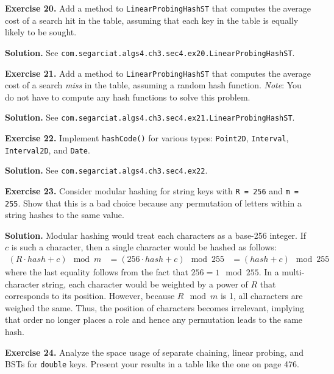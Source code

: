 \documentclass[12pt, a4paper]{article}
\newenvironment{ex}[2][Exercise]
{\par\medskip\noindent \textbf{#1 #2.}}
{\medskip}
\newenvironment{sol}[1][Solution]
{\par\medskip\noindent \textbf{#1.} }
{\medskip}
\begin{document}
	\begin{ex}{20}
		Add a method to \texttt{LinearProbingHashST} that computes the average cost of a search hit
		in the table, assuming that each key in the table is equally likely to be sought.
	\end{ex}
	\begin{sol}
		See \texttt{com.segarciat.algs4.ch3.sec4.ex20.LinearProbingHashST}.
	\end{sol}
	\begin{ex}{21}
		Add a method to \texttt{LinearProbingHashST} that computes the average cost of a search \emph{miss}
		in the table, assuming a random hash function. \emph{Note}: You do not have to compute any hash
		functions to solve this problem.
	\end{ex}
	\begin{sol}
		See \texttt{com.segarciat.algs4.ch3.sec4.ex21.LinearProbingHashST}.
	\end{sol}
	\begin{ex}{22}
		Implement \texttt{hashCode()} for various types: \texttt{Point2D}, \texttt{Interval},
		\texttt{Interval2D}, and \texttt{Date}.
	\end{ex}
	\begin{sol}
		See \texttt{com.segarciat.algs4.ch3.sec4.ex22}.
	\end{sol}
	\begin{ex}{23}
		Consider modular hashing for string keys with \texttt{R = 256} and \texttt{m = 255}.
		Show that this is a bad choice because any permutation of letters within a string
		hashes to the same value.
	\end{ex}
	\begin{sol}
		Modular hashing would treat each characters as a base-256 integer. If $c$ is such
		a character, then a single character would be hashed as follows:
		\begin{align*}
			(R \cdot hash + c) \mod m&=(256\cdot hash + c)\mod 255&=(hash + c)\mod 255
		\end{align*}
		where the last equality follows from the fact that $256=1\mod 255$.
		In a multi-character string, each character would be weighted by a power of $R$ that
		corresponds to its position. However, because $R\mod m$ is 1, all characters
		are weighed the same. Thus, the position of characters becomes irrelevant,
		implying that order no longer places a role and hence any permutation leads
		to the same hash.
	\end{sol}
	\begin{ex}{24}
		Analyze the space usage of separate chaining, linear probing, and BSTs for
		\texttt{double} keys. Present your results in a table like the one on page 476.
	\end{ex}
\end{document}
